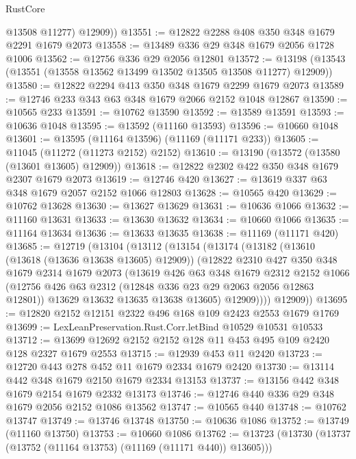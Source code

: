 \begin{lexlean}{RustCore}
\begin{coremodule}
          @13508
          @11277)
        @12909))
@13551 := @12822 @2288 @408 @350 @348 @1679 @2291 @1679 @2073
@13558 := @13489 @336 @29 @348 @1679 @2056 @1728 @1006
@13562 := @12756 @336 @29 @2056 @12801
@13572 := @13198 (@13543 (@13551 (@13558 @13562 @13499 @13502 @13505 @13508 @11277) @12909))
@13580 := @12822 @2294 @413 @350 @348 @1679 @2299 @1679 @2073
@13589 := @12746 @233 @343 @63 @348 @1679 @2066 @2152 @1048 @12867
@13590 := @10565 @233
@13591 := @10762 @13590
@13592 := @13589 @13591
@13593 := @10636 @1048
@13595 := @13592 (@11160 @13593)
@13596 := @10660 @1048
@13601 := @13595 (@11164 @13596) (@11169 (@11171 @233))
@13605 := @11045 (@11272 (@11273 @2152) @2152)
@13610 := @13190 (@13572 (@13580 (@13601 @13605) @12909))
@13618 := @12822 @2302 @422 @350 @348 @1679 @2307 @1679 @2073
@13619 := @12746 @420
@13627 := @13619 @337 @63 @348 @1679 @2057 @2152 @1066 @12803
@13628 := @10565 @420
@13629 := @10762 @13628
@13630 := @13627 @13629
@13631 := @10636 @1066
@13632 := @11160 @13631
@13633 := @13630 @13632
@13634 := @10660 @1066
@13635 := @11164 @13634
@13636 := @13633 @13635
@13638 := @11169 (@11171 @420)
@13685 := @12719
    (@13104
      (@13112
        (@13154
          (@13174
            (@13182
              (@13610 (@13618 (@13636 @13638 @13605) @12909))
              (@12822
                @2310
                @427
                @350
                @348
                @1679
                @2314
                @1679
                @2073
                (@13619
                  @426
                  @63
                  @348
                  @1679
                  @2312
                  @2152
                  @1066
                  (@12756 @426 @63 @2312 (@12848 @336 @23 @29 @2063 @2056 @12863 @12801))
                  @13629
                  @13632
                  @13635
                  @13638
                  @13605)
                @12909))))
        @12909))
@13695 := @12820 @2152 @12151 @2322 @496 @168 @109 @2423 @2553 @1679 @1769
@13699 := LexLeanPreservation.Rust.Corr.letBind @10529 @10531 @10533
@13712 := @13699 @12692 @2152 @2152 @128 @11 @453 @495 @109 @2420 @128 @2327 @1679 @2553
@13715 := @12939 @453 @11 @2420
@13723 := @12720 @443 @278 @452 @11 @1679 @2334 @1679 @2420
@13730 := @13114 @442 @348 @1679 @2150 @1679 @2334 @13153
@13737 := @13156 @442 @348 @1679 @2154 @1679 @2332 @13173
@13746 := @12746 @440 @336 @29 @348 @1679 @2056 @2152 @1086 @13562
@13747 := @10565 @440
@13748 := @10762 @13747
@13749 := @13746 @13748
@13750 := @10636 @1086
@13752 := @13749 (@11160 @13750)
@13753 := @10660 @1086
@13762 := @13723 (@13730 (@13737 (@13752 (@11164 @13753) (@11169 (@11171 @440)) @13605)))

\end{coremodule}
\end{lexlean}

